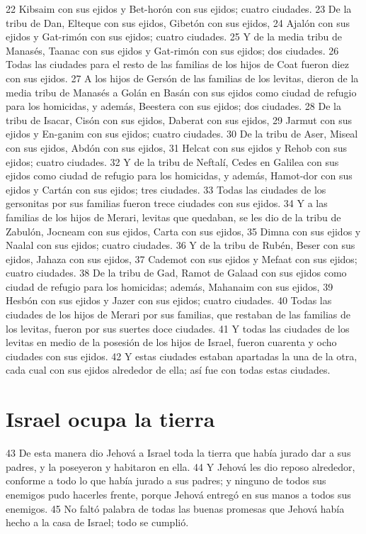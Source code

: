 22 Kibsaim con sus ejidos y Bet-horón con sus ejidos; cuatro ciudades.
23 De la tribu de Dan, Elteque con sus ejidos, Gibetón con sus ejidos,
24 Ajalón con sus ejidos y Gat-rimón con sus ejidos; cuatro ciudades.
25 Y de la media tribu de Manasés, Taanac con sus ejidos y Gat-rimón con sus ejidos; dos ciudades.
26 Todas las ciudades para el resto de las familias de los hijos de Coat fueron diez con sus ejidos.
27 A los hijos de Gersón de las familias de los levitas, dieron de la media tribu de Manasés a Golán en Basán con sus ejidos como ciudad de refugio para los homicidas, y además, Beestera con sus ejidos; dos ciudades.
28 De la tribu de Isacar, Cisón con sus ejidos, Daberat con sus ejidos,
29 Jarmut con sus ejidos y En-ganim con sus ejidos; cuatro ciudades.
30 De la tribu de Aser, Miseal con sus ejidos, Abdón con sus ejidos,
31 Helcat con sus ejidos y Rehob con sus ejidos; cuatro ciudades.
32 Y de la tribu de Neftalí, Cedes en Galilea con sus ejidos como ciudad de refugio para los homicidas, y además, Hamot-dor con sus ejidos y Cartán con sus ejidos; tres ciudades.
33 Todas las ciudades de los gersonitas por sus familias fueron trece ciudades con sus ejidos.
34 Y a las familias de los hijos de Merari, levitas que quedaban, se les dio de la tribu de Zabulón, Jocneam con sus ejidos, Carta con sus ejidos,
35 Dimna con sus ejidos y Naalal con sus ejidos; cuatro ciudades.
36 Y de la tribu de Rubén, Beser con sus ejidos, Jahaza con sus ejidos,
37 Cademot con sus ejidos y Mefaat con sus ejidos; cuatro ciudades.
38 De la tribu de Gad, Ramot de Galaad con sus ejidos como ciudad de refugio para los homicidas; además, Mahanaim con sus ejidos, 
39 Hesbón con sus ejidos y Jazer con sus ejidos; cuatro ciudades.
40 Todas las ciudades de los hijos de Merari por sus familias, que restaban de las familias de los levitas, fueron por sus suertes doce ciudades.
41 Y todas las ciudades de los levitas en medio de la posesión de los hijos de Israel, fueron cuarenta y ocho ciudades con sus ejidos.
42 Y estas ciudades estaban apartadas la una de la otra, cada cual con sus ejidos alrededor de ella; así fue con todas estas ciudades.

\section*{Israel ocupa la tierra}

43 De esta manera dio Jehová a Israel toda la tierra que había jurado dar a sus padres, y la poseyeron y habitaron en ella.
44 Y Jehová les dio reposo alrededor, conforme a todo lo que había jurado a sus padres; y ninguno de todos sus enemigos pudo hacerles frente, porque Jehová entregó en sus manos a todos sus enemigos.
45 No faltó palabra de todas las buenas promesas que Jehová había hecho a la casa de Israel; todo se cumplió.


